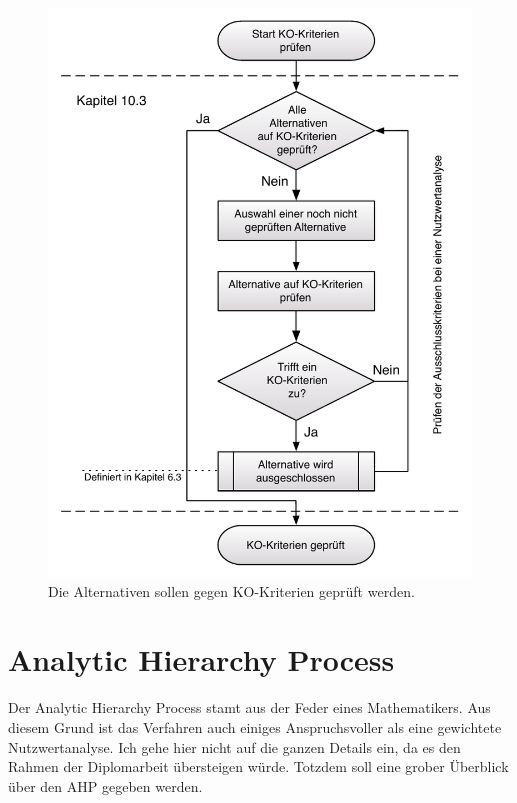   \begin{figure}[htb]
    \begin{center}
      \includegraphics[width=\textwidth]{./image/rahmenbedingungenPruefen.pdf}
      \caption{Die Alternativen sollen gegen KO-Kriterien geprüft werden.}
      \label{img:rahmenbedingungenPruefen}
    \end{center}
  \end{figure}
  
  \clearpage
 
  \section{Analytic Hierarchy Process}
  
  Der Analytic Hierarchy Process stamt aus der Feder eines Mathematikers. Aus
  diesem Grund ist das Verfahren auch einiges Anspruchsvoller als eine
  gewichtete Nutzwertanalyse. Ich gehe hier nicht auf die ganzen Details ein, da
  es den Rahmen der Diplomarbeit übersteigen würde. Totzdem soll eine grober
  Überblick über den \ac{AHP} gegeben werden.
  
